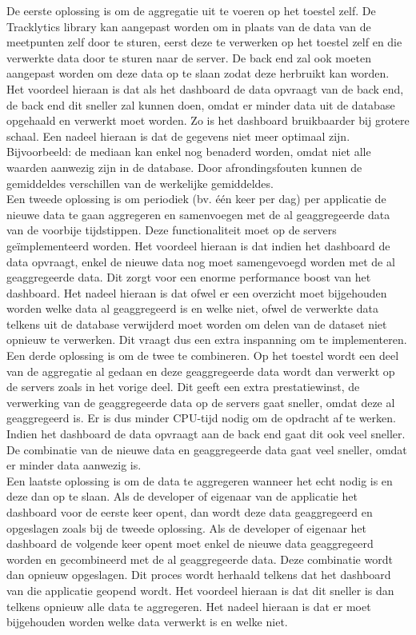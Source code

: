 De eerste oplossing is om de aggregatie uit te voeren op het toestel zelf. De Tracklytics library kan aangepast worden om in plaats van de data van de meetpunten zelf door te sturen, eerst deze te verwerken op het toestel zelf en die verwerkte data door te sturen naar de server. De back end zal ook moeten aangepast worden om deze data op te slaan zodat deze herbruikt kan worden. Het voordeel hieraan is dat als het dashboard de data opvraagt van de back end, de back end dit sneller zal kunnen doen, omdat er minder data uit de database opgehaald en verwerkt moet worden. Zo is het dashboard bruikbaarder bij grotere schaal. Een nadeel hieraan is dat de gegevens niet meer optimaal zijn. Bijvoorbeeld: de mediaan kan enkel nog benaderd worden, omdat niet alle waarden aanwezig zijn in de database. Door afrondingsfouten kunnen de gemiddeldes verschillen van de werkelijke gemiddeldes. \\

Een tweede oplossing is om periodiek (bv. \'e\'en keer per dag) per applicatie de nieuwe data te gaan aggregeren en samenvoegen met de al geaggregeerde data van de voorbije tijdstippen. Deze functionaliteit moet op de servers ge\"implementeerd worden. Het voordeel hieraan is dat indien het dashboard de data opvraagt, enkel de nieuwe data nog moet samengevoegd worden met de al geaggregeerde data. Dit zorgt voor een enorme performance boost van het dashboard. Het nadeel hieraan is dat ofwel er een overzicht moet bijgehouden worden welke data al geaggregeerd is en welke niet, ofwel de verwerkte data telkens uit de database verwijderd moet worden om delen van de dataset niet opnieuw te verwerken. Dit vraagt dus een extra inspanning om te implementeren. \\

Een derde oplossing is om de twee te combineren. Op het toestel wordt een deel van de aggregatie al gedaan en deze geaggregeerde data wordt dan verwerkt op de servers zoals in het vorige deel. Dit geeft een extra prestatiewinst, de verwerking van de geaggregeerde data op de servers gaat sneller, omdat deze al geaggregeerd is. Er is dus minder CPU-tijd nodig om de opdracht af te werken. Indien het dashboard de data opvraagt aan de back end gaat dit ook veel sneller. De combinatie van de nieuwe data en geaggregeerde data gaat veel sneller, omdat er minder data aanwezig is. \\

Een laatste oplossing is om de data te aggregeren wanneer het echt nodig is en deze dan op te slaan. Als de developer of eigenaar van de applicatie het dashboard voor de eerste keer opent, dan wordt deze data geaggregeerd en opgeslagen zoals bij de tweede oplossing. Als de developer of eigenaar het dashboard de volgende keer opent moet enkel de nieuwe data geaggregeerd worden en gecombineerd met de al geaggregeerde data. Deze combinatie wordt dan opnieuw opgeslagen. Dit proces wordt herhaald telkens dat het dashboard van die applicatie geopend wordt. Het voordeel hieraan is dat dit sneller is dan telkens opnieuw alle data te aggregeren. Het nadeel hieraan is dat er moet bijgehouden worden welke data verwerkt is en welke niet. \\


